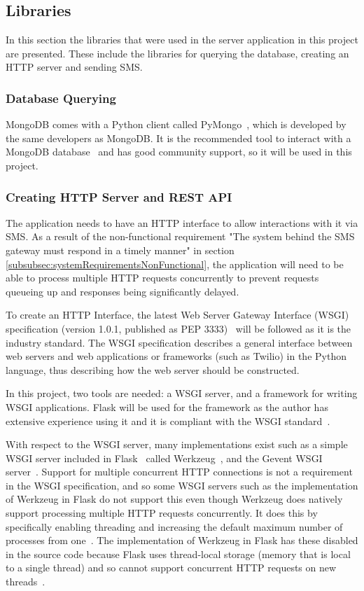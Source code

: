 \documentclass[authoryearcitations]{UoYCSproject}
\begin{document}
\subsection{Libraries}
In this section the libraries that were used in the server application in this project are presented. These include the libraries for querying the database, creating an HTTP server and sending SMS.

\subsubsection{Database Querying}
MongoDB comes with a Python client called PyMongo~\cite{libraryPyMongo}, which is developed by the same developers as MongoDB.  It is the recommended tool to interact with a MongoDB database~\cite{pyMongoDoc} and has good community support, so it will be used in this project.

\subsubsection{Creating HTTP Server and REST API}
The application needs to have an HTTP interface to allow interactions with it via SMS.  As a result of the non-functional requirement "The system behind the SMS gateway must respond in a timely manner" in section \ref{subsubsec:systemRequirementsNonFunctional}, the application will need to be able to process multiple HTTP requests concurrently to prevent requests queueing up and responses being significantly delayed.

To create an HTTP Interface, the latest Web Server Gateway Interface (WSGI) specification (version 1.0.1, published as PEP 3333)~\cite{eby2010python} will be followed as it is the industry standard. The WSGI specification describes a general interface between web servers and web applications or frameworks (such as Twilio) in the Python language, thus describing how the web server should be constructed.

In this project, two tools are needed: a WSGI server, and a framework for writing WSGI applications. Flask will be used for the framework as the author has extensive experience using it and it is compliant with the WSGI standard~\cite{libraryFlask}.

With respect to the WSGI server, many implementations exist such as a simple WSGI server included in Flask~\cite{libraryFlask} called Werkzeug~\cite{libraryWerkzeug}, and the Gevent WSGI server~\cite{libraryGevent}.  Support for multiple concurrent HTTP connections is not a requirement in the WSGI specification, and so some WSGI servers such as the implementation of Werkzeug in Flask do not support this even though Werkzeug does natively support processing multiple HTTP requests concurrently. It does this by specifically enabling threading and increasing the default maximum number of processes from one~\cite{werkzeugThreading}. The implementation of Werkzeug in Flask has these disabled in the source code because Flask uses thread-local storage (memory that is local to a single thread) and so cannot support concurrent HTTP requests on new threads~\cite{flaskThreading}.
\end{document}
